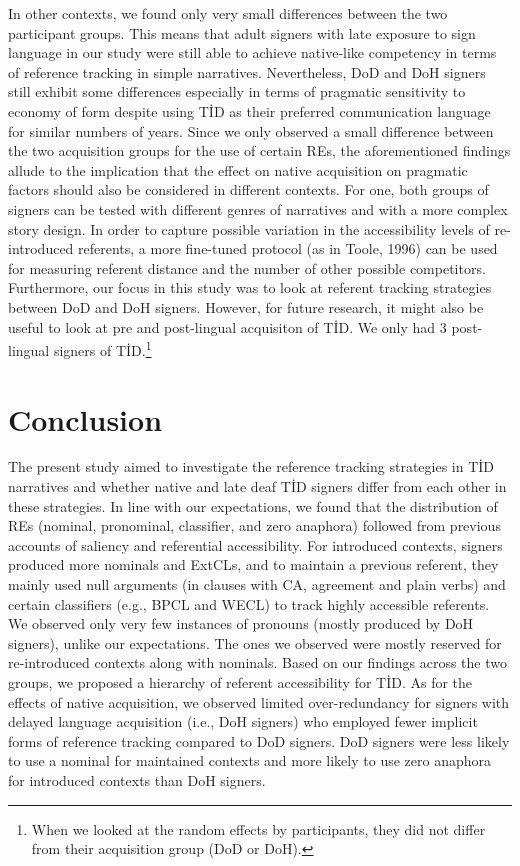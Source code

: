 \documentclass[]{elsarticle} %
\begin{document}
In other contexts, we found only very small differences between the two
participant groups. This means that adult signers with late exposure to
sign language in our study were still able to achieve native-like
competency in terms of reference tracking in simple narratives.
Nevertheless, DoD and DoH signers still exhibit some differences
especially in terms of pragmatic sensitivity to economy of form despite
using TİD as their preferred communication language for similar numbers
of years. Since we only observed a small difference between the two
acquisition groups for the use of certain REs, the aforementioned
findings allude to the implication that the effect on native acquisition
on pragmatic factors should also be considered in different contexts.
For one, both groups of signers can be tested with different genres of
narratives and with a more complex story design. In order to capture
possible variation in the accessibility levels of re-introduced
referents, a more fine-tuned protocol (as in Toole, 1996) can be used
for measuring referent distance and the number of other possible
competitors. Furthermore, our focus in this study was to look at
referent tracking strategies between DoD and DoH signers. However, for
future research, it might also be useful to look at pre and post-lingual
acquisiton of TİD. We only had 3 post-lingual signers of
TİD.\footnote{When we looked at the random effects by participants, they did not differ from their acquisition group (DoD or DoH).}

\clearpage

\hypertarget{conclusion}{%
\section{Conclusion}\label{conclusion}}

The present study aimed to investigate the reference tracking strategies
in TİD narratives and whether native and late deaf TİD signers differ
from each other in these strategies. In line with our expectations, we
found that the distribution of REs (nominal, pronominal, classifier, and
zero anaphora) followed from previous accounts of saliency and
referential accessibility. For introduced contexts, signers produced
more nominals and ExtCLs, and to maintain a previous referent, they
mainly used null arguments (in clauses with CA, agreement and plain
verbs) and certain classifiers (e.g., BPCL and WECL) to track highly
accessible referents. We observed only very few instances of pronouns
(mostly produced by DoH signers), unlike our expectations. The ones we
observed were mostly reserved for re-introduced contexts along with
nominals. Based on our findings across the two groups, we proposed a
hierarchy of referent accessibility for TİD. As for the effects of
native acquisition, we observed limited over-redundancy for signers with
delayed language acquisition (i.e., DoH signers) who employed fewer
implicit forms of reference tracking compared to DoD signers. DoD
signers were less likely to use a nominal for maintained contexts and
more likely to use zero anaphora for introduced contexts than DoH
signers.
\end{document}
